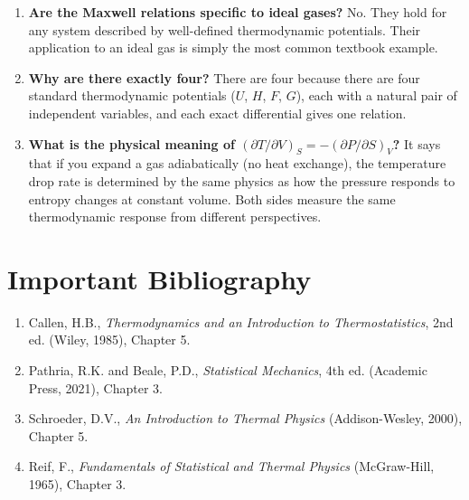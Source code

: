 \begin{enumerate}
\item \textbf{Are the Maxwell relations specific to ideal gases?}
No. They hold for any system described by well-defined thermodynamic potentials. Their application to an ideal gas is simply the most common textbook example.

\item \textbf{Why are there exactly four?}
There are four because there are four standard thermodynamic potentials ($U$, $H$, $F$, $G$), each with a natural pair of independent variables, and each exact differential gives one relation.

\item \textbf{What is the physical meaning of $(\partial T/\partial V)_{S} = -(\partial P/\partial S)_{V}$?}
It says that if you expand a gas adiabatically (no heat exchange), the temperature drop rate is determined by the same physics as how the pressure responds to entropy changes at constant volume. Both sides measure the same thermodynamic response from different perspectives.
\end{enumerate}
\section*{Important Bibliography}

\begin{enumerate}
\item Callen, H.B., \textit{Thermodynamics and an Introduction to Thermostatistics}, 2nd ed. (Wiley, 1985), Chapter 5.
\item Pathria, R.K. and Beale, P.D., \textit{Statistical Mechanics}, 4th ed. (Academic Press, 2021), Chapter 3.
\item Schroeder, D.V., \textit{An Introduction to Thermal Physics} (Addison-Wesley, 2000), Chapter 5.
\item Reif, F., \textit{Fundamentals of Statistical and Thermal Physics} (McGraw-Hill, 1965), Chapter 3.
\end{enumerate}

